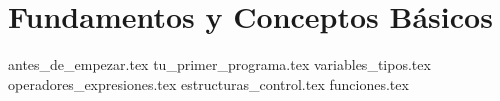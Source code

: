 \chapter{Fundamentos y Conceptos Básicos}
\label{chap:fundamentos_conceptos_basicos}


{antes_de_empezar.tex}
{tu_primer_programa.tex}
{variables_tipos.tex}
{operadores_expresiones.tex}
{estructuras_control.tex}
{funciones.tex}  %
